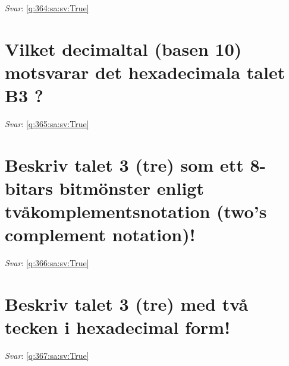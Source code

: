\documentclass[a4paper,11pt,oneside]{book}
\begin{document}
\begin{sloppypar}
\vspace{2cm}

\noindent\makebox[\textwidth]{\hrulefill}

\vspace{1cm}

\textit{Svar}: \autoref{q:364:sa:sv:True}



\section{Vilket decimaltal (basen 10) motsvarar det hexadecimala talet B3 ?}

\label{q:365:sa:sv:False}

\vspace{2cm}

\noindent\makebox[\textwidth]{\hrulefill}

\vspace{1cm}

\textit{Svar}: \autoref{q:365:sa:sv:True}



\section{Beskriv talet 3 (tre) som ett 8-bitars bitm\"onster enligt tv\r{a}komplementsnotation (two{\textquoteright}s complement notation)!}

\label{q:366:sa:sv:False}

\vspace{2cm}

\noindent\makebox[\textwidth]{\hrulefill}

\vspace{1cm}

\textit{Svar}: \autoref{q:366:sa:sv:True}



\section{Beskriv talet 3 (tre) med tv\r{a} tecken i hexadecimal form!}

\label{q:367:sa:sv:False}

\vspace{2cm}

\noindent\makebox[\textwidth]{\hrulefill}

\vspace{1cm}

\textit{Svar}: \autoref{q:367:sa:sv:True}




\end{sloppypar}
\end{document}
